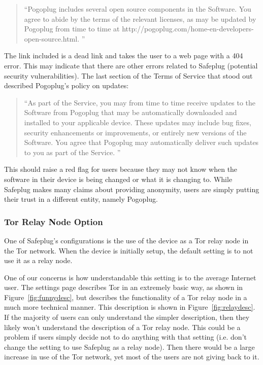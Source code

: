 \begin{quotation}
``Pogoplug includes several open source components in the Software. You agree to abide by the terms of the relevant licenses, as may be updated by Pogoplug from time to time at http://pogoplug.com/home-en-developers-open-source.html. '' \cite{safeplug}
\end{quotation}

The link included is a dead link and takes the user to a web page with a 404 error.  This may indicate that there are other errors related to Safeplug (potential security vulnerabilities).  The last section of the Terms of Service that stood out described Pogoplug's policy on updates:

\begin{quotation}
``As part of the Service, you may from time to time receive updates to the Software from Pogoplug that may be automatically downloaded and installed to your applicable device. These updates may include bug fixes, security enhancements or improvements, or entirely new versions of the Software. You agree that Pogoplug may automatically deliver such updates to you as part of the Service. '' \cite{safeplug}
\end{quotation}

This should raise a red flag for users because they may not know when the software in their device is being changed or what it is changing to.  While Safeplug makes many claims about providing anonymity, users are simply putting their trust in a different entity, namely Pogoplug.

\subsubsection{Tor Relay Node Option}
One of Safeplug's configurations is the use of the device as a Tor relay node in the Tor network.  When the device is initially setup, the default setting is to not use it as a relay node.  

One of our concerns is how understandable this setting is to the average Internet user.  The settings page describes Tor in an extremely basic way, as shown in Figure~\ref{fig:funnydesc}, but describes the functionality of a Tor relay node in a much more technical manner.  This description is shown in Figure~\ref{fig:relaydesc}.  If the majority of users can only understand the simpler description, then they likely won't understand the description of a Tor relay node.  This could be a problem if users simply decide not to do anything with that setting (i.e. don't change the setting to use Safeplug as a relay node).  Then there would be a large increase in use of the Tor network, yet most of the users are not giving back to it.

